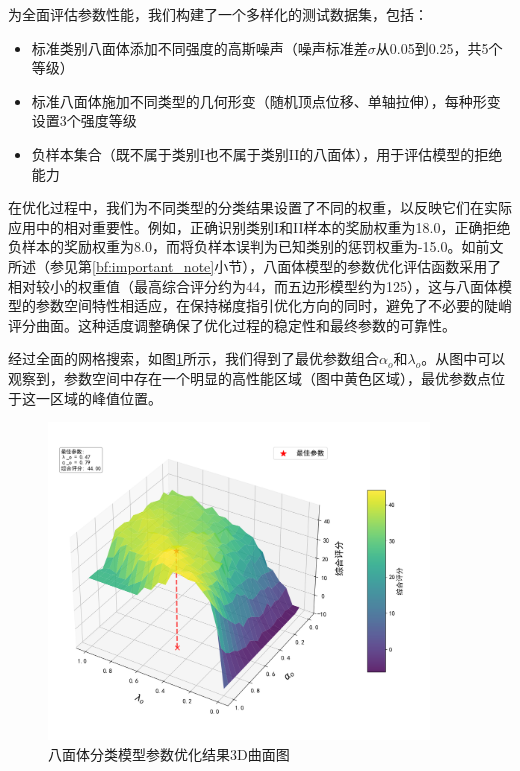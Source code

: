 为全面评估参数性能，我们构建了一个多样化的测试数据集，包括：
    \begin{itemize}
    \item 标准类别八面体添加不同强度的高斯噪声（噪声标准差$\sigma$从0.05到0.25，共5个等级）
    \item 标准八面体施加不同类型的几何形变（随机顶点位移、单轴拉伸），每种形变设置3个强度等级
    \item 负样本集合（既不属于类别I也不属于类别II的八面体），用于评估模型的拒绝能力
    \end{itemize}
    
在优化过程中，我们为不同类型的分类结果设置了不同的权重，以反映它们在实际应用中的相对重要性。例如，正确识别类别I和II样本的奖励权重为18.0，正确拒绝负样本的奖励权重为8.0，而将负样本误判为已知类别的惩罚权重为-15.0。如前文所述（参见第\ref{bf:important_note}小节），八面体模型的参数优化评估函数采用了相对较小的权重值（最高综合评分约为44，而五边形模型约为125），这与八面体模型的参数空间特性相适应，在保持梯度指引优化方向的同时，避免了不必要的陡峭评分曲面。这种适度调整确保了优化过程的稳定性和最终参数的可靠性。
    
经过全面的网格搜索，如图\ref{fig:param_optimization_3d}所示，我们得到了最优参数组合$\alpha_o$和$\lambda_o$。从图中可以观察到，参数空间中存在一个明显的高性能区域（图中黄色区域），最优参数点位于这一区域的峰值位置。
    
    \begin{figure}[H]
        \centering
    \includegraphics[width=0.9\textwidth]{figures2/params/octahedron_parameter_optimization_3d.png}
    \caption{八面体分类模型参数优化结果3D曲面图}
    \label{fig:param_optimization_3d}
    \end{figure}
    

